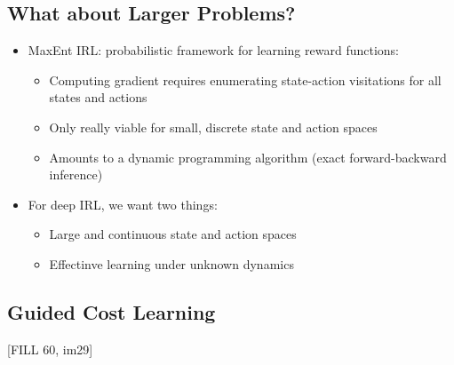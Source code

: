 \documentclass[10pt]{article}
\begin{document}
\subsection*{What about Larger Problems?}
\begin{itemize}
	\item MaxEnt IRL: probabilistic framework for learning reward functions:
	\begin{itemize}
        \item Computing gradient requires enumerating state-action visitations for all states and actions
        \item Only really viable for small, discrete state and action spaces
        \item Amounts to a dynamic programming algorithm (exact forward-backward inference)
    \end{itemize}
	\item For deep IRL, we want two things:
	\begin{itemize}
        \item Large and continuous state and action spaces
        \item Effectinve learning under unknown dynamics
    \end{itemize}
\end{itemize}

\subsection*{Guided Cost Learning}
[FILL 60, im29]
\end{document}
